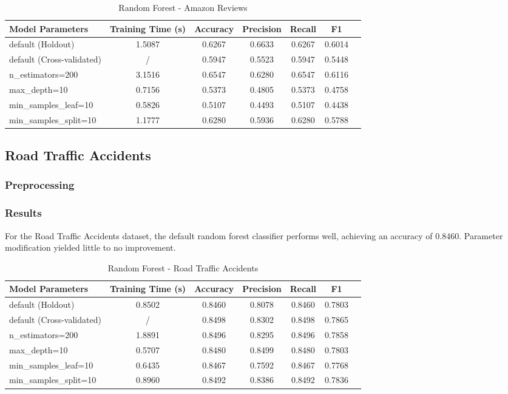 \documentclass{article}
\begin{document}
\begin{table}[ht]
\centering
\begin{tabular}{l|c|c|c|c|c|c}
\textbf{Model Parameters} & \textbf{Training Time (s)} & \textbf{Accuracy} & \textbf{Precision} & \textbf{Recall} & \textbf{F1} \\\hline
default (Holdout) & 1.5087  & 0.6267 & 0.6633 & 0.6267 & 0.6014 \\
default (Cross-validated) & /  & 0.5947 & 0.5523 & 0.5947 & 0.5448 \\
n\_estimators=200 & 3.1516  & 0.6547 & 0.6280 & 0.6547 & 0.6116 \\
max\_depth=10 & 0.7156  & 0.5373 & 0.4805 & 0.5373 & 0.4758 \\
min\_samples\_leaf=10 & 0.5826  & 0.5107 & 0.4493 & 0.5107 & 0.4438 \\
min\_samples\_split=10 & 1.1777  & 0.6280 & 0.5936 & 0.6280 & 0.5788 \\
\end{tabular}
\caption{Random Forest - Amazon Reviews}
\label{tab:Random Forest - Amazon Reviews}
\end{table}




\subsection{Road Traffic Accidents}
\subsubsection{Preprocessing}
\subsubsection{Results}

For the Road Traffic Accidents dataset, the default random forest classifier performs well, achieving an accuracy of 0.8460. Parameter modification yielded little to no improvement.

\begin{table}[ht]
\centering
\begin{tabular}{l|c|c|c|c|c|c}
\textbf{Model Parameters} & \textbf{Training Time (s)} & \textbf{Accuracy} & \textbf{Precision} & \textbf{Recall} & \textbf{F1} \\\hline
default (Holdout) & 0.8502  & 0.8460 & 0.8078 & 0.8460 & 0.7803 \\
default (Cross-validated) & /  & 0.8498 & 0.8302 & 0.8498 & 0.7865 \\
n\_estimators=200 & 1.8891  & 0.8496 & 0.8295 & 0.8496  & 0.7858 \\
max\_depth=10 & 0.5707  & 0.8480 & 0.8499 & 0.8480 & 0.7803 \\
min\_samples\_leaf=10 & 0.6435  & 0.8467  & 0.7592 & 0.8467 & 0.7768 \\
min\_samples\_split=10 & 0.8960  & 0.8492 & 0.8386 & 0.8492 & 0.7836 \\
\end{tabular}
\caption{Random Forest - Road Traffic Accidents}
\label{tab:Random Forest - Road Traffic Accidents}
\end{table}
\end{document}
